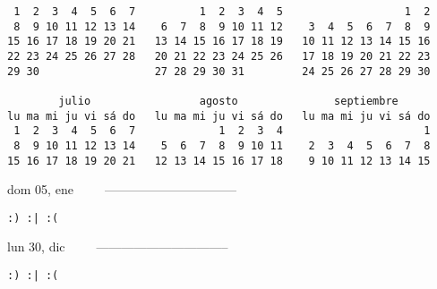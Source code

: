 \documentclass[letterpaper,10pt]{article}
\begin{document}
\begin{multicols}{3}
\begin{center}
\begin{tiny}
\begin{verbatim} 1  2  3  4  5  6  7          1  2  3  4  5                   1  2
 8  9 10 11 12 13 14    6  7  8  9 10 11 12    3  4  5  6  7  8  9
15 16 17 18 19 20 21   13 14 15 16 17 18 19   10 11 12 13 14 15 16
22 23 24 25 26 27 28   20 21 22 23 24 25 26   17 18 19 20 21 22 23
29 30                  27 28 29 30 31         24 25 26 27 28 29 30

        julio                 agosto               septiembre
lu ma mi ju vi sá do   lu ma mi ju vi sá do   lu ma mi ju vi sá do
 1  2  3  4  5  6  7             1  2  3  4                      1
 8  9 10 11 12 13 14    5  6  7  8  9 10 11    2  3  4  5  6  7  8
15 16 17 18 19 20 21   12 13 14 15 16 17 18    9 10 11 12 13 14 15\end{verbatim}
\end{tiny}
\end{center}
{dom 05, ene\ \ \ \ \ --------------------------------}
\begin{flushright}\begin{small}\texttt{:) :| :(}\end{small}\end{flushright}\par

{lun 30, dic\ \ \ \ \ --------------------------------}
\begin{flushright}\begin{small}\texttt{:) :| :(}\end{small}\end{flushright}\par

\end{multicols}
\end{document}
